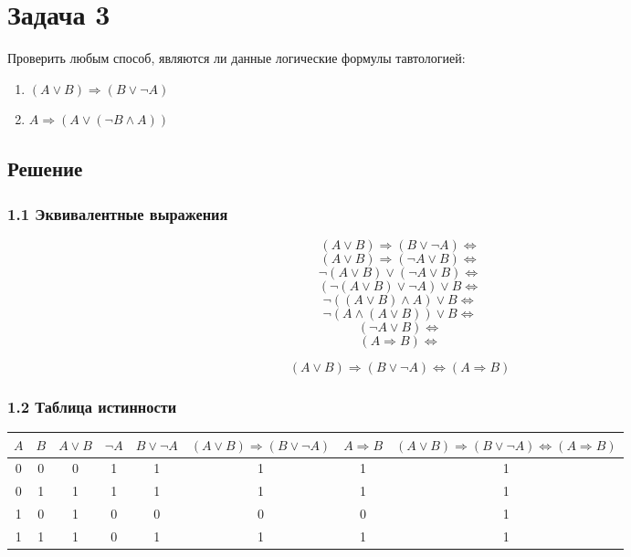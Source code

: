 \section*{Задача 3}

Проверить любым способ,
являются ли данные логические формулы тавтологией:

\begin{enumerate}
  \item \((A \vee B) \Rightarrow (B \vee \neg A)\)
  \item \(A \Rightarrow  (A \vee (\neg B \wedge A))\)
\end{enumerate}

\subsection*{Решение}

\subsubsection*{1.1 Эквивалентные выражения}

\[(A \vee B) \Rightarrow (B \vee \neg A) \Leftrightarrow\]
\[(A \vee B) \Rightarrow (\neg A \vee B) \Leftrightarrow\]
\[\neg (A \vee B) \vee (\neg A \vee B) \Leftrightarrow\]
\[(\neg (A \vee B) \vee \neg A) \vee B \Leftrightarrow\]
\[\neg ((A \vee B) \wedge A) \vee B \Leftrightarrow\]
\[\neg (A \wedge (A \vee B)) \vee B \Leftrightarrow\]
\[(\neg A \vee B) \Leftrightarrow\]
\[(A \Rightarrow B) \Leftrightarrow\]

\[(A \vee B) \Rightarrow (B \vee \neg A) \Leftrightarrow (A \Rightarrow B)\]

\subsubsection*{1.2 Таблица истинности}

\begin{center}
  \begin{tabular}{c c | c c c c | c | c}
     \(A\) &
     \(B\) &
     \(A \vee B\) &
     \(\neg A\) &
     \(B \vee \neg A\) &
     \((A \vee B) \Rightarrow (B \vee \neg A)\) & 
     \(A \Rightarrow B\) & 
     \((A \vee B) \Rightarrow (B \vee \neg A) \Leftrightarrow (A \Rightarrow B)\) \\
     \hline
     0 & 0 & 0 & 1 & 1 & 1 & 1 & 1 \\
     0 & 1 & 1 & 1 & 1 & 1 & 1 & 1 \\
     1 & 0 & 1 & 0 & 0 & 0 & 0 & 1 \\
     1 & 1 & 1 & 0 & 1 & 1 & 1 & 1
  \end{tabular}
\end{center}

